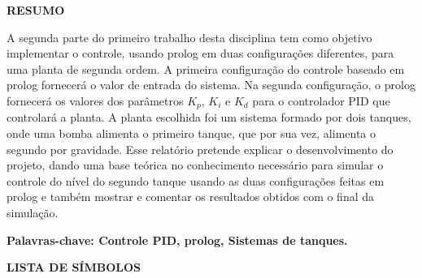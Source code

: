 \documentclass[a4paper,12pt]{article}
\begin{document}
\newpage


\thispagestyle{empty}

\begin{center}
{\large \textbf{RESUMO}}
\end{center}

\vspace{2cm}

A segunda parte do primeiro trabalho desta disciplina tem como objetivo implementar o controle, usando prolog em duas configurações diferentes, para uma planta de segunda ordem. A primeira configuração do controle baseado em prolog fornecerá o valor de entrada do sistema. Na segunda configuração, o prolog fornecerá os valores dos parâmetros $K_p$, $K_i$ e $K_d$ para o controlador PID que controlará a planta. A planta escolhida foi um sistema formado por dois tanques, onde uma bomba alimenta o primeiro tanque, que por sua vez, alimenta o segundo por gravidade. Esse relatório pretende explicar o desenvolvimento do projeto, dando uma base teórica no conhecimento necessário para simular o controle do nível do segundo tanque usando as duas configurações feitas em prolog e também mostrar e comentar os resultados obtidos com o final da simulação. 

\vspace{1.5cm}

\textbf{Palavras-chave: Controle PID,  prolog, Sistemas de tanques.}

\newpage


\thispagestyle{empty}

\begin{center}
{\large \textbf{LISTA DE SÍMBOLOS}}
\end{center}

\vspace{1.0cm}
\end{document}
